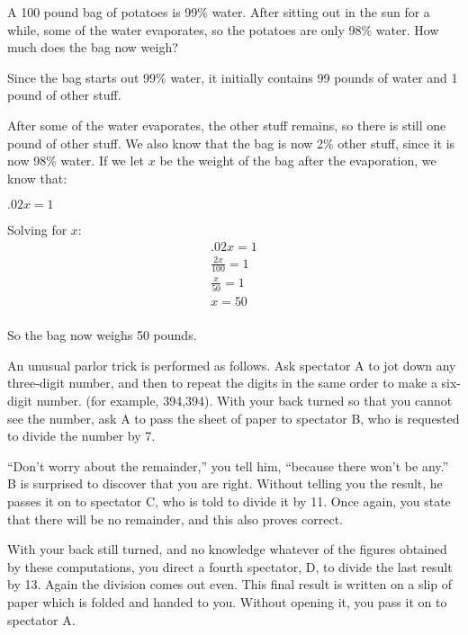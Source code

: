 \documentclass[fleqn,addpoints]{exam}
\begin{document}
\begin{questions}

\question
A 100 pound bag of potatoes is 99\% water.  After sitting out in the sun for a while, some of the water
evaporates, so the potatoes are only 98\% water.  How much does the bag now weigh?

\begin{solution}
Since the bag starts out 99\% water, it initially contains 99 pounds of water and 1 pound of other stuff.  

After some of the water evaporates, the other stuff remains, so there is still one pound of other stuff.  We also know
that the bag is now 2\% other stuff, since it is now 98\% water.  If we let $x$ be the weight of the bag after the
evaporation, we know that:

\( .02x = 1 \)

Solving for $x$:
\begin{align*}
  .02x = 1 \\
  \frac{2x}{100} = 1 \\  
  \frac{x}{50} = 1 \\  
  x = 50 \\  
\end{align*}

So the bag now weighs 50 pounds.

\end{solution}

\question 

An unusual parlor trick is performed as follows.  Ask spectator A to jot down any three-digit number, and then to repeat
the digits in the same order to make a six-digit number. (for example, 394,394).  With your back turned so that you
cannot see the number, ask A to pass the sheet of paper to spectator B, who is requested to divide the number by 7.

``Don't worry about the remainder,'' you tell him, ``because there won't be any.''  B is surprised to discover that you
are right.  Without telling you the result, he passes it on to spectator C, who is told to divide it by 11.  Once again,
you state that there will be no remainder, and this also proves correct.

With your back still turned, and no knowledge whatever of the figures obtained by these computations, you direct a
fourth spectator, D, to divide the last result by 13.  Again the division comes out even.  This final result is written
on a slip of paper which is folded and handed to you.  Without opening it, you pass it on to spectator A.


\end{questions}
\end{document}
